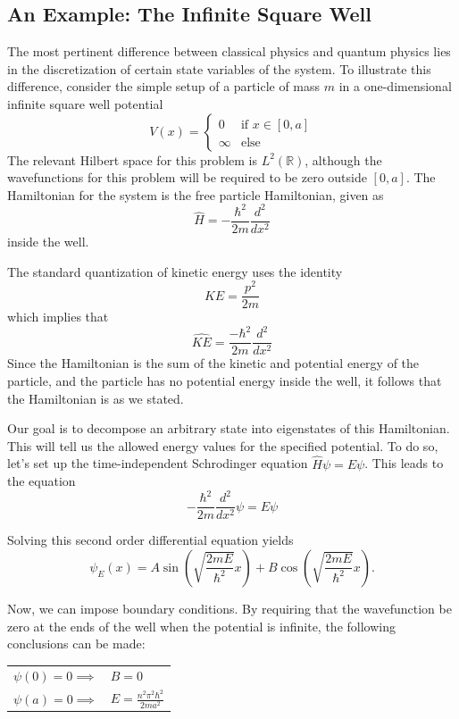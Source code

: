 \subsection{An Example: The Infinite Square Well}

The most pertinent difference between classical physics and quantum physics lies
in the discretization of certain state variables of the system. To illustrate
this difference, consider the simple setup of a particle of mass $m$ in a
one-dimensional infinite square well potential
\[
    V(x) =
    \begin{cases}
        0 & \text{if } x\in[0,a]\\  \infty & \text{else}
    \end{cases}
\]
The relevant Hilbert space for this problem is $L^2(\mathbb{R})$, although the
wavefunctions for this problem will be required to be zero outside $[0,a]$.
The Hamiltonian for the system is the free particle Hamiltonian, given as
\[
    \hat{H} = -\frac{\hbar^2}{2m}\frac{d^2}{dx^2}
\]
inside the well.

The standard quantization of kinetic energy uses the identity
\[
    KE = \frac{p^2}{2m}
\]
which implies that
\[
    \widehat{KE} = \frac{-\hbar^2}{2m}\frac{d^2}{dx^2}
\]
Since the Hamiltonian is the sum of the kinetic and potential energy of the
particle, and the particle has no potential energy inside the well, it follows
that the Hamiltonian is as we stated.

Our goal is to decompose an arbitrary state into eigenstates of this
Hamiltonian. This will tell us the allowed energy values for the specified
potential. To do so, let's set up the time-independent Schrodinger equation
$\hat{H}\psi = E\psi$.
This leads to the equation
\[
    -\frac{\hbar^2}{2m}\frac{d^2}{dx^2}\psi = E \psi
\]

Solving this second order differential equation yields
\[
    \psi_E(x) =
    A\sin\left(\sqrt{\frac{2mE}{\hbar^2}}x\right) +
    B\cos\left(\sqrt{\frac{2mE}{\hbar^2}}x\right).
\]

Now, we can impose boundary conditions. By requiring that the wavefunction be
zero at the ends of the well when the potential is infinite, the following
conclusions can be made:
\begin{center}
\begin{tabular}{l l}
    $\psi(0) = 0 \implies$  & $B = 0$\\
    $\psi(a) = 0 \implies$  & $E = \frac{n^2\pi^2\hbar^2}{2ma^2}$
\end{tabular}
\end{center}

